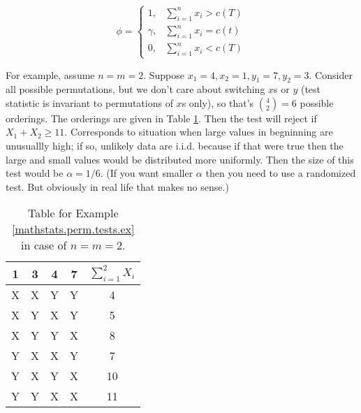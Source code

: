 \begin{solution}
\[
\phi = \begin{cases}
1, & \sum_{i=1}^n x_i > c(T) \\
\gamma, & \sum_{i=1}^n x_i = c(t) \\
0, & \sum_{i=1}^n x_i < c(T)
\end{cases}
\]

For example, assume \(n = m = 2\). Suppose \(x_1 = 4, x_2 = 1, y_1 = 7, y_2 = 3\). Consider all possible permutations, but we don't care about switching \(x\)s or \(y\) (test statistic is invariant to permutations of \(x\)s only), so that's \(\binom{4}{2} = 6\) possible orderings. The orderings are given in Table \ref{mathstats.np.perm.test.ex}. Then the test will reject if \(X_1 + X_2 \geq 11\). Corresponds to situation when large values in begninning are unusuallly high; if so, unlikely data are i.i.d. because if that were true then the large and small values would be distributed more uniformly. Then the size of this test would be \(\alpha = 1/6\). (If you want smaller \(\alpha\) then you need to use a randomized test. But obviously in real life that makes no sense.) 

\begin{table}[htp]
\caption{Table for Example \ref{mathstats.perm.tests.ex} in case of \(n=m=2\).}
\begin{center}
\begin{tabular}{|c|c|c|c|| c | }
1 & 3 & 4 & 7 & \(\sum_{i=1}^2 X_i\) \\ \hline
X & X& Y & Y & 4 \\
X & Y & X & Y & 5 \\
X & Y & Y & X & 8 \\
Y & X & X & Y & 7\\
Y & X & Y & X & 10 \\
Y & Y & X & X & 11
\end{tabular}
\end{center}
\label{mathstats.np.perm.test.ex}
\end{table}%


\end{solution}

%
%




